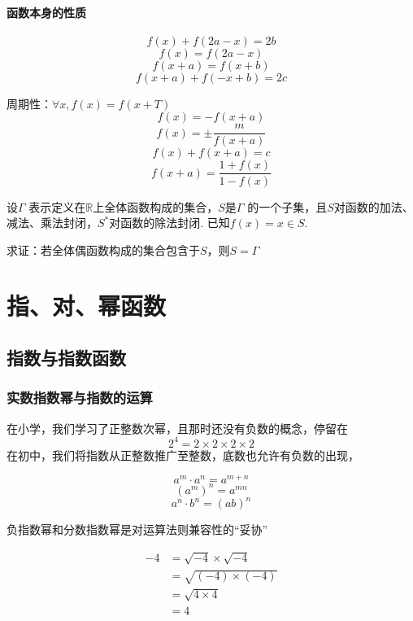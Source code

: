 \subsubsection*{函数本身的性质}
\[f(x)+f(2a-x)=2b\]
\[f(x)=f(2a-x)\]
\[f(x+a)=f(x+b)\]
\[f(x+a)+f(-x+b)=2c\]

周期性：$\forall x,f(x)=f(x+T)$
\[f(x)=-f(x+a)\]
\[f(x)=\pm\frac{m}{f(x+a)}\] 
\[f(x)+f(x+a)=c\]
\[f(x+a)=\frac{1+f(x)}{1-f(x)}\]
\hw
\begin{homework}
    设$\Gamma$ 表示定义在$\mathbb{R}$上全体函数构成的集合，$S$是$\Gamma$
    的一个子集，且$S$对函数的加法、减法、乘法封闭，$S^*$对函数的除法封闭.
    已知$f(x)=x\in S$.
    
    求证：若全体偶函数构成的集合包含于$S$，则$S=\Gamma$
\end{homework}
\clearpage


\clearpage
\chapter{指、对、幂函数}
\section{指数与指数函数}

\subsection{实数指数幂与指数的运算}
在小学，我们学习了正整数次幂，且那时还没有负数的概念，停留在
\[2^4=2\times2\times2\times2\]
在初中，我们将指数从正整数推广至整数，底数也允许有负数的出现，

\begin{theorem}
    \begin{equation}
        a^m\cdot a^n=a^{m+n}
    \end{equation}
    \begin{equation}
        (a^m)^n=a^{mn}
    \end{equation}
    \begin{equation}
        a^n\cdot b^n=(ab)^n
    \end{equation}
\end{theorem}

负指数幂和分数指数幂是对运算法则兼容性的“妥协”
\begin{example}[Euler的谬误]
    \[\begin{aligned}
        -4&=\sqrt{-4}\times \sqrt{-4}\\
        &=\sqrt{(-4)\times(-4)}\\
        &=\sqrt{4\times 4}\\
        &=4
    \end{aligned}\]


\end{example}


